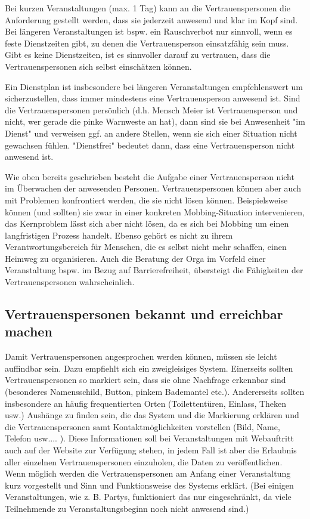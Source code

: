 \documentclass[DIV=calc]{scrartcl}
\begin{document}
Bei kurzen Veranstaltungen (max. 1 Tag) kann an die Vertrauenspersonen die Anforderung gestellt werden, dass sie jederzeit anwesend und klar im Kopf sind. Bei längeren Veranstaltungen ist bspw. ein Rauschverbot nur sinnvoll, wenn es feste Dienstzeiten gibt, zu denen die Vertrauensperson einsatzfähig sein muss. Gibt es keine Dienstzeiten, ist es sinnvoller darauf zu vertrauen, dass die Vertrauenspersonen sich selbst einschätzen können. 

Ein Dienstplan ist insbesondere bei längeren Veranstaltungen empfehlenswert um sicherzustellen, dass immer mindestens eine Vertrauensperson anwesend ist. Sind die Vertrauenspersonen persönlich (d.h. Mensch Meier ist Vertrauensperson und nicht, wer gerade die pinke Warnweste an hat), dann sind sie bei Anwesenheit "im Dienst" und verweisen ggf. an andere Stellen, wenn sie sich einer Situation nicht gewachsen fühlen. "Dienstfrei" bedeutet dann, dass eine Vertrauensperson nicht anwesend ist.

Wie oben bereits geschrieben besteht die Aufgabe einer Vertrauensperson nicht im Überwachen der anwesenden Personen. Vertrauenspersonen können aber auch mit Problemen konfrontiert werden, die sie nicht lösen können. Beispielsweise können (und sollten) sie zwar in einer konkreten Mobbing-Situation intervenieren, das Kernproblem lässt sich aber nicht lösen, da es sich bei Mobbing um einen langfristigen Prozess handelt. Ebenso gehört es nicht zu ihrem Verantwortungsbereich für Menschen, die es selbst nicht mehr schaffen, einen Heimweg zu organisieren. Auch die Beratung der Orga im Vorfeld einer Veranstaltung bspw. im Bezug auf Barrierefreiheit,  übersteigt die Fähigkeiten der Vertrauenspersonen wahrscheinlich.

\subsection{Vertrauenspersonen bekannt und erreichbar machen}

Damit Vertrauenspersonen angesprochen werden können, müssen sie leicht auffindbar sein. Dazu empfiehlt sich ein zweigleisiges System. Einerseits sollten Vertrauenspersonen so markiert sein, dass sie ohne Nachfrage erkennbar sind (besonderes Namensschild, Button, pinkem Bademantel etc.). Andererseits sollten insbesondere an häufig frequentierten Orten (Toilettentüren, Einlass, Theken usw.) Aushänge zu finden sein, die das System und die Markierung erklären und die Vertrauenspersonen samt Kontaktmöglichkeiten vorstellen (Bild, Name, Telefon usw.... ). Diese Informationen soll bei Veranstaltungen mit Webauftritt auch auf der Website zur Verfügung stehen, in jedem Fall ist aber die Erlaubnis aller einzelnen Vertrauenspersonen einzuholen, die Daten zu veröffentlichen. Wenn möglich werden die Vertrauenspersonen am Anfang einer Veranstaltung kurz vorgestellt und Sinn und Funktionsweise des Systems erklärt. (Bei einigen Veranstaltungen, wie z. B. Partys, funktioniert das nur eingeschränkt, da viele Teilnehmende zu Veranstaltungsbeginn noch nicht anwesend sind.)
\end{document}
